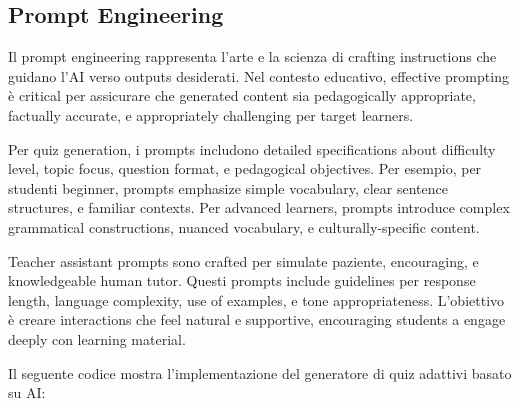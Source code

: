 \documentclass[12pt,a4paper]{article}
\begin{document}
\subsection{Prompt Engineering}

Il prompt engineering rappresenta l'arte e la scienza di crafting instructions che guidano l'AI verso outputs desiderati. Nel contesto educativo, effective prompting è critical per assicurare che generated content sia pedagogically appropriate, factually accurate, e appropriately challenging per target learners.

Per quiz generation, i prompts includono detailed specifications about difficulty level, topic focus, question format, e pedagogical objectives. Per esempio, per studenti beginner, prompts emphasize simple vocabulary, clear sentence structures, e familiar contexts. Per advanced learners, prompts introduce complex grammatical constructions, nuanced vocabulary, e culturally-specific content.

Teacher assistant prompts sono crafted per simulate paziente, encouraging, e knowledgeable human tutor. Questi prompts include guidelines per response length, language complexity, use of examples, e tone appropriateness. L'obiettivo è creare interactions che feel natural e supportive, encouraging students a engage deeply con learning material.

Il seguente codice mostra l'implementazione del generatore di quiz adattivi basato su AI:
\end{document}
